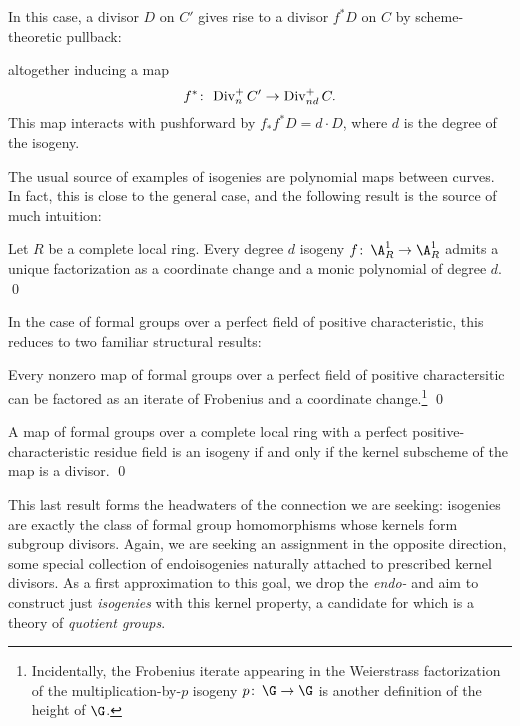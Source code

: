 \begin{remark}
In this case, a divisor \(D\) on \(C'\) gives rise to a divisor \(f^* D\) on \(C\) by scheme-theoretic pullback:
\begin{center}
\end{center}
altogether inducing a map \[f^*\colon\thinspace \operatorname{Div}_n^+ C' \to \operatorname{Div}_{nd}^+ C.\]  This map interacts with pushforward by \(f_* f^* D = d \cdot D\), where \(d\) is the degree of the isogeny.
\end{remark}

The usual source of examples of isogenies are polynomial maps between curves.  In fact, this is close to the general case, and the following result is the source of much intuition:
\begin{lemma}
Let \(R\) be a complete local ring.  Every degree \(d\) isogeny \(f\co \A^1_R \to \A^1_R\) admits a unique factorization as a coordinate change and a monic polynomial of degree \(d\). \qed
\end{lemma}

\noindent In the case of formal groups over a perfect field of positive characteristic, this reduces to two familiar structural results:

\begin{corollary}\label{FrobeniusFactorizations}
Every nonzero map of formal groups over a perfect field of positive charactersitic can be factored as an iterate of Frobenius and a coordinate change.\footnote{Incidentally, the Frobenius iterate appearing in the Weierstrass factorization of the multiplication-by-\(p\) isogeny \(p\co \G \to \G\) is another definition of the height of \(\G\).} \qed
\end{corollary}

\begin{corollary}
A map of formal groups over a complete local ring with a perfect positive-characteristic residue field is an isogeny if and only if the kernel subscheme of the map is a divisor. \qed
\end{corollary}

This last result forms the headwaters of the connection we are seeking: isogenies are exactly the class of formal group homomorphisms whose kernels form subgroup divisors.  Again, we are seeking an assignment in the opposite direction, some special collection of endoisogenies naturally attached to prescribed kernel divisors.  As a first approximation to this goal, we drop the \emph{endo-} and aim to construct just \emph{isogenies} with this kernel property, a candidate for which is a theory of \textit{quotient groups}.

